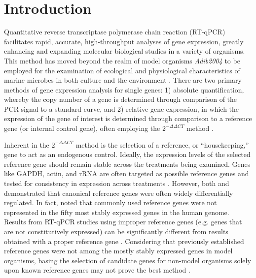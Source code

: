 \section{Introduction}
Quantitative reverse transcriptase polymerase chain reaction (RT-qPCR) facilitates rapid, accurate, high-throughput analyses of gene expression, greatly enhancing and expanding molecular biological studies in a variety of organisms. This method has moved beyond the realm of model organisms \textit{Adib2004} \citep{Antonov2005, Caldwell2005, Marionneau2005, Flatt2008} to be employed for the examination of ecological and physiological characteristics of marine microbes in both culture and the environment \citep{Zehr2001, Nicot2005, Maldonado2006, Mock2008, Zhao2009, Whitney2011a, Wurch2011, Allen2008, Kustka2007, Lin2009}. There are two primary methods of gene expression analysis for single genes: 1) absolute quantification, whereby the copy number of a gene is determined through comparison of the PCR signal to a standard curve, and 2) relative gene expression, in which the expression of the gene of interest is determined through comparison to a reference gene (or internal control gene), often employing the  $2^{- \Delta \Delta CT}$ method \citep{Livak2001, Pfaffl2001, Schmittgen2008}. \par
Inherent in the $2^{- \Delta \Delta CT}$ method is the selection of a reference, or ``housekeeping,'' gene to act as an endogenous control. Ideally, the expression levels of the selected reference gene should remain stable across the treatments being examined. Genes like GAPDH, actin, and rRNA are often targeted as possible reference genes and tested for consistency in expression across treatments \citep{Vandesompele2002, Pfaffl2004, Radonic2004}. However, both \citet{Czechowski2005} and \citet{DeJonge2007a} demonstrated that canonical reference genes were often widely differentially regulated. In fact, \citet{DeJonge2007a} noted that commonly used reference genes were not represented in the fifty most stably expressed genes in the human genome. Results from RT-qPCR studies using improper reference genes (e.g. genes that are not constitutively expressed) can be significantly different from results obtained with a proper reference gene \citep{Dheda2005, Lanoix2012a}. Considering that previously established reference genes were not among the mostly stably expressed genes in model organisms, basing the selection of candidate genes for non-model organisms solely upon known reference genes may not prove the best method \citep{DeJonge2007a, Czechowski2005}. \par
